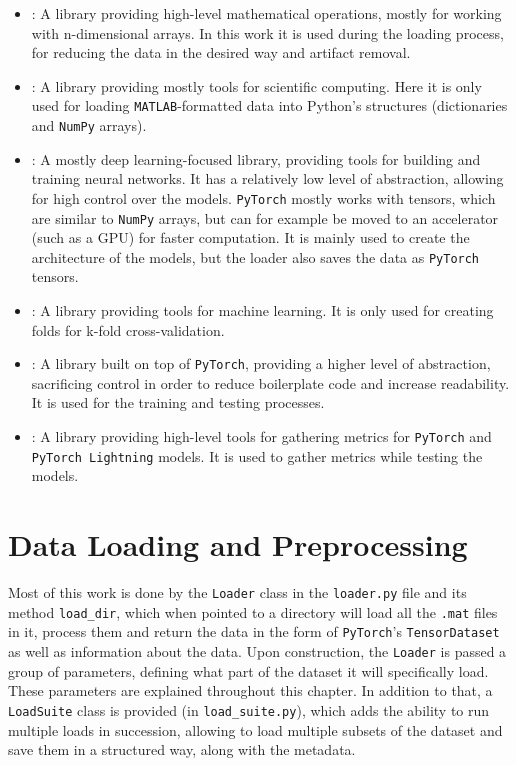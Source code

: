 \documentclass[english, he, bc, kiv, iso690alph]{fasthesis}
\begin{document}
\begin{itemize}

\item{}: A library providing high-level mathematical operations, mostly for working with n-dimensional arrays. In this work it is used during the loading process, for reducing the data in the desired way and artifact removal.

\item{}: A library providing mostly tools for scientific computing. Here it is only used for loading \texttt{MATLAB}-formatted data into Python's structures (dictionaries and \texttt{NumPy} arrays).

\item{}: A mostly deep learning-focused library, providing tools for building and training neural networks. It has a relatively low level of abstraction, allowing for high control over the models. \texttt{PyTorch} mostly works with tensors, which are similar to \texttt{NumPy} arrays, but can for example be moved to an accelerator (such as a GPU) for faster computation. It is mainly used to create the architecture of the models, but the loader also saves the data as \texttt{PyTorch} tensors.

\item{}: A library providing tools for machine learning. It is only used for creating folds for k-fold cross-validation.

\item{}: A library built on top of \texttt{PyTorch}, providing a higher level of abstraction, sacrificing control in order to reduce boilerplate code and increase readability. It is used for the training and testing processes.

\item{}: A library providing high-level tools for gathering metrics for \texttt{PyTorch} and \texttt{PyTorch Lightning} models. It is used to gather metrics while testing the models.

\end{itemize}

\section{Data Loading and Preprocessing}

Most of this work is done by the \texttt{Loader} class in the \texttt{loader.py} file and its method \texttt{load\_dir}, which when pointed to a directory will load all the \texttt{.mat} files in it, process them and return the data in the form of \texttt{PyTorch}'s \texttt{TensorDataset} as well as information about the data. Upon construction, the \texttt{Loader} is passed a group of parameters, defining what part of the dataset it will specifically load. These parameters are explained throughout this chapter. In addition to that, a \texttt{LoadSuite} class is provided (in \texttt{load\_suite.py}), which adds the ability to run multiple loads in succession, allowing to load multiple subsets of the dataset and save them in a structured way, along with the metadata.
\end{document}
